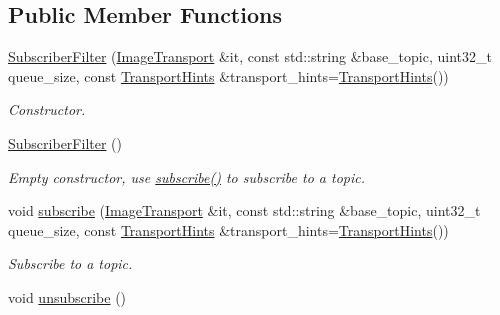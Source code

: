 \subsection*{Public Member Functions}
\begin{DoxyCompactItemize}
\item 
\hyperlink{classimage__transport_1_1_subscriber_filter_afae6f86755c38b573bc5fa35e43e37f3}{Subscriber\-Filter} (\hyperlink{classimage__transport_1_1_image_transport}{Image\-Transport} \&it, const std\-::string \&base\-\_\-topic, uint32\-\_\-t queue\-\_\-size, const \hyperlink{classimage__transport_1_1_transport_hints}{Transport\-Hints} \&transport\-\_\-hints=\hyperlink{classimage__transport_1_1_transport_hints}{Transport\-Hints}())
\begin{DoxyCompactList}\small\item\em Constructor. \end{DoxyCompactList}\item 
\hypertarget{classimage__transport_1_1_subscriber_filter_a2378a43c41e4fe123193ca637eb49afd}{\hyperlink{classimage__transport_1_1_subscriber_filter_a2378a43c41e4fe123193ca637eb49afd}{Subscriber\-Filter} ()}\label{classimage__transport_1_1_subscriber_filter_a2378a43c41e4fe123193ca637eb49afd}

\begin{DoxyCompactList}\small\item\em Empty constructor, use \hyperlink{classimage__transport_1_1_subscriber_filter_a20afdaa28a22ffdbf62226ba1c95e561}{subscribe()} to subscribe to a topic. \end{DoxyCompactList}\item 
void \hyperlink{classimage__transport_1_1_subscriber_filter_a20afdaa28a22ffdbf62226ba1c95e561}{subscribe} (\hyperlink{classimage__transport_1_1_image_transport}{Image\-Transport} \&it, const std\-::string \&base\-\_\-topic, uint32\-\_\-t queue\-\_\-size, const \hyperlink{classimage__transport_1_1_transport_hints}{Transport\-Hints} \&transport\-\_\-hints=\hyperlink{classimage__transport_1_1_transport_hints}{Transport\-Hints}())
\begin{DoxyCompactList}\small\item\em Subscribe to a topic. \end{DoxyCompactList}\item 
\hypertarget{classimage__transport_1_1_subscriber_filter_a058bfa4c200c90d7cabd18a2d674084b}{void \hyperlink{classimage__transport_1_1_subscriber_filter_a058bfa4c200c90d7cabd18a2d674084b}{unsubscribe} ()}\label{classimage__transport_1_1_subscriber_filter_a058bfa4c200c90d7cabd18a2d674084b}


\end{DoxyCompactItemize}
